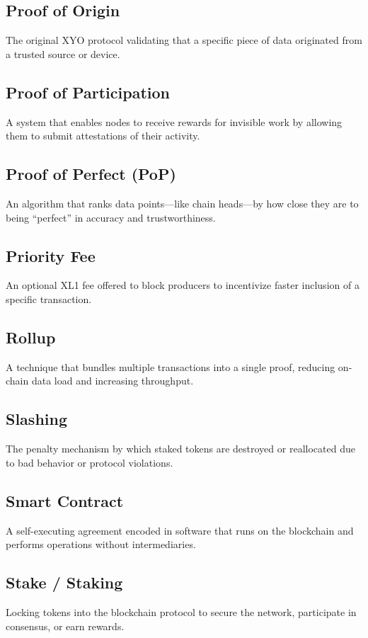 \documentclass{article}
\begin{document}
\subsection*{Proof of Origin}
The original XYO protocol validating that a specific piece of data originated from a trusted source or device.

\subsection*{Proof of Participation}
A system that enables nodes to receive rewards for invisible work by allowing them to submit attestations of their activity.

\subsection*{Proof of Perfect (PoP)}
An algorithm that ranks data points—like chain heads—by how close they are to being “perfect” in accuracy and trustworthiness.

\subsection*{Priority Fee}
An optional XL1 fee offered to block producers to incentivize faster inclusion of a specific transaction.

\subsection*{Rollup}
A technique that bundles multiple transactions into a single proof, reducing on-chain data load and increasing throughput.

\subsection*{Slashing}
The penalty mechanism by which staked tokens are destroyed or reallocated due to bad behavior or protocol violations.

\subsection*{Smart Contract}
A self-executing agreement encoded in software that runs on the blockchain and performs operations without intermediaries.

\subsection*{Stake / Staking}
Locking tokens into the blockchain protocol to secure the network, participate in consensus, or earn rewards.
\end{document}
